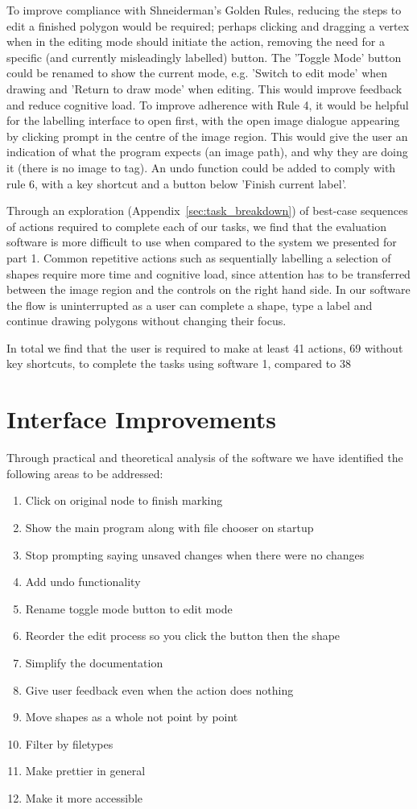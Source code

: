 \documentclass[a4paper,11pt,oneside]{article}
\begin{document}
To improve compliance with Shneiderman's Golden Rules, reducing the steps to edit a finished polygon would be required; perhaps clicking and dragging a vertex when in the editing mode should initiate the action, removing the need for a specific (and currently misleadingly labelled) button. The 'Toggle Mode' button could be renamed to show the current mode, e.g. 'Switch to edit mode' when drawing and 'Return to draw mode' when editing. This would improve feedback and reduce cognitive load. To improve adherence with Rule 4, it would be helpful for the labelling interface to open first, with the open image dialogue appearing by clicking prompt in the centre of the image region. This would give the user an indication of what the program expects (an image path), and why they are doing it (there is no image to tag). An undo function could be added to comply with rule 6, with a key shortcut and a button below 'Finish current label'.

Through an exploration (Appendix~\ref{sec:task_breakdown}) of best-case sequences of actions required to complete each of our tasks, we find that the evaluation software is more difficult to use when compared to the system we presented for part 1. Common repetitive actions such as sequentially labelling a selection of shapes require more time and cognitive load, since attention has to be transferred between the image region and the controls on the right hand side. In our software the flow is uninterrupted as a user can complete a shape, type a label and continue drawing polygons without changing their focus.

In total we find that the user is required to make at least 41 actions, 69 without key shortcuts, to complete the tasks using software 1, compared to 38

\section{Interface Improvements}
Through practical and theoretical analysis of the software we have identified the following areas to be addressed:
\begin{enumerate}
    \item{Click on original node to finish marking}
    \item{Show the main program along with file chooser on startup}
    \item{Stop prompting saying unsaved changes when there were no changes}
    \item{Add undo functionality}
    \item{Rename toggle mode button to edit mode}
    \item{Reorder the edit process so you click the button then the shape}
    \item{Simplify the documentation}
    \item{Give user feedback even when the action does nothing}
    \item{Move shapes as a whole not point by point}
    \item{Filter by filetypes}
    \item{Make prettier in general}
    \item{Make it more accessible}
\end{enumerate}
\end{document}
